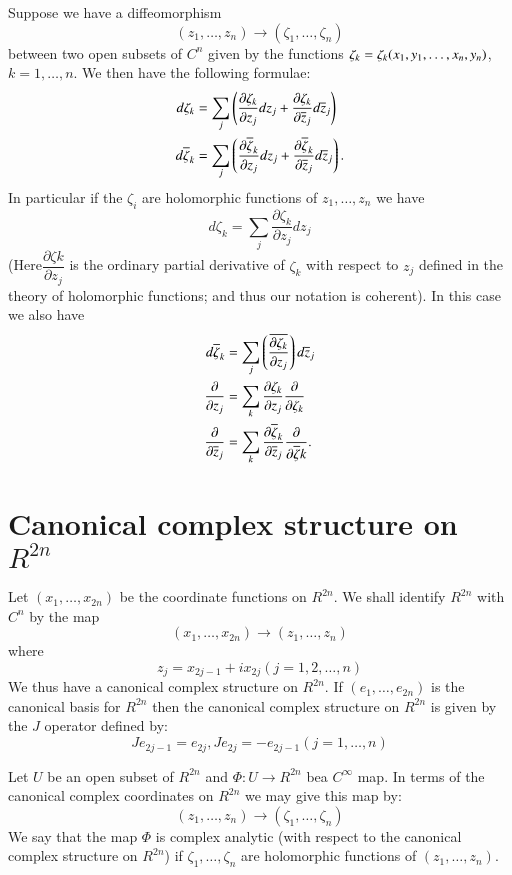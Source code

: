 Suppose we have a diffeomorphism
$$
(z_{1},\ldots,z_{n})\to (\zeta_{1},\ldots,\zeta_{n})
$$
between two open subsets of $C^{n}$ given by the functions
$\zeta_{k}=\zeta_{k}(x_{1},y_{1},\break\ldots,x_{n},y_{n})$,
$k=1,\ldots,n$. We then have the following formulae:
\begin{align*}
d\zeta_{k} &= \sum_{j}\left(\frac{\partial \zeta_{k}}{\partial
  z_{j}}dz_{j}+\frac{\partial \zeta_{k}}{\partial
  \overline{z}_{j}}d\overline{z}_{j}\right)\\
d\overline{\zeta}_{k} &= \sum_{j}\left(\frac{\partial
  \overline{\zeta}_{k}}{\partial z_{j}}dz_{j}+\frac{\partial
  \overline{\zeta}_{k}}{\partial \overline{z}_{j}}d\overline{z}_{j}\right). 
\end{align*}
In particular if the $\zeta_{i}$ are holomorphic functions of
$z_{1},\ldots,z_{n}$ we have
$$
d\zeta_{k}=\sum_{j}\frac{\partial \zeta_{k}}{\partial z_{j}}dz_{j}
$$
(Here\pageoriginale $\dfrac{\partial \zeta k}{\partial z_{j}}$ is the ordinary
partial derivative of $\zeta_{k}$ with respect to $z_{j}$ defined in
the theory of holomorphic functions; and thus our notation is
coherent). In this case we also have
\begin{align*}
d\overline{\zeta}_{k} &= \sum_{j}\left(\frac{\overline{\partial
    \zeta_{k}}}{\partial z_{j}}\right)d\overline{z}_{j}\\
\frac{\partial}{\partial z_{j}} &= \sum_{k}\frac{\partial
  \zeta_{k}}{\partial z_{j}}\frac{\partial}{\partial \zeta_{k}}\\
\frac{\partial}{\partial \overline{z}_{j}} &= \sum_{k}\frac{\partial
  \overline{\zeta}_{k}}{\partial \overline{z}_{j}}\frac{\partial}{\partial
  \overline{\zeta}k}. 
\end{align*}

\section*{Canonical complex structure on $R^{2n}$}

Let $(x_{1},\ldots,x_{2n})$ be the coordinate functions on
$R^{2n}$. We shall identify $R^{2n}$ with $C^{n}$ by the map
$$
(x_{1},\ldots,x_{2n})\to (z_{1},\ldots,z_{n})
$$
where
$$
z_{j}=x_{2j-1}+ix_{2j}(j=1,2,\ldots,n)
$$
We thus have a canonical complex structure on $R^{2n}$. If
$(e_{1},\ldots,e_{2n})$ is the canonical basis for $R^{2n}$ then the
canonical complex structure on $R^{2n}$ is given by the $J$ operator
defined by:
$$
Je_{2j-1}=e_{2j}, Je_{2j}=-e_{2j-1}(j=1,\ldots,n)
$$

Let $U$ be an open subset of $R^{2n}$ and $\Phi:U\to R^{2n}$
be\pageoriginale a $C^{\infty}$ map. In terms of the canonical complex
coordinates on $R^{2n}$ we may give this map by:
$$
(z_{1},\ldots,z_{n})\to (\zeta_{1},\ldots,\zeta_{n})
$$
We say that the map $\Phi$ is complex analytic (with respect to the
canonical complex structure on $R^{2n}$) if
$\zeta_{1},\ldots,\zeta_{n}$ are holomorphic functions of
$(z_{1},\ldots,z_{n})$. 

